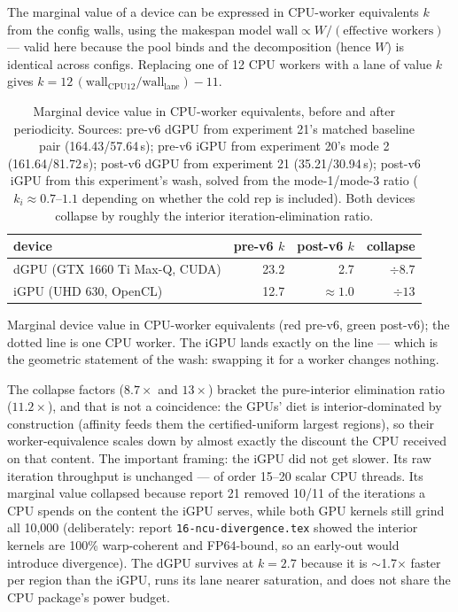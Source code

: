 \documentclass[
	english,
	letterpaper, oneside
]{article}
\begin{document}
The marginal value of a device can be expressed in CPU-worker equivalents
$k$ from the config walls, using the makespan model
$\text{wall} \propto W/(\text{effective workers})$ --- valid here because the
pool binds and the decomposition (hence $W$) is identical across configs.
Replacing one of 12 CPU workers with a lane of value $k$ gives
$k = 12\,({\text{wall}_{\text{CPU12}}}/{\text{wall}_{\text{lane}}}) - 11$.

\begin{table}[H]
\centering
\caption{Marginal device value in CPU-worker equivalents, before and after
periodicity. Sources: pre-v6 dGPU from experiment 21's matched baseline pair
(164.43/57.64\,s); pre-v6 iGPU from experiment 20's mode 2 (161.64/81.72\,s);
post-v6 dGPU from experiment 21 (35.21/30.94\,s); post-v6 iGPU from this
experiment's wash, solved from the mode-1/mode-3 ratio ($k_i \approx
0.7$--$1.1$ depending on whether the cold rep is included). Both devices
collapse by roughly the interior iteration-elimination ratio.\label{tab:k}}
\begin{tabular}{lrrr}
\toprule
device & pre-v6 $k$ & post-v6 $k$ & collapse \\
\midrule
dGPU (GTX 1660 Ti Max-Q, CUDA) & 23.2 & 2.7 & $\div 8.7$ \\
iGPU (UHD 630, OpenCL) & 12.7 & $\approx 1.0$ & $\div 13$ \\
\bottomrule
\end{tabular}
\end{table}

            {Marginal device value in CPU-worker equivalents (red pre-v6,
             green post-v6); the dotted line is one CPU worker. The iGPU
             lands exactly on the line --- which is the geometric statement
             of the wash: swapping it for a worker changes nothing.
             \label{fig:reprice}}

The collapse factors ($8.7\times$ and $13\times$) bracket the pure-interior
elimination ratio ($11.2\times$), and that is not a coincidence: the GPUs'
diet is interior-dominated by construction (affinity feeds them the
certified-uniform largest regions), so their worker-equivalence scales down
by almost exactly the discount the CPU received on that content. The
important framing: the iGPU did not get slower. Its raw iteration
throughput is unchanged --- of order 15--20 scalar CPU threads. Its
marginal value collapsed because report 21 removed 10/11 of the
iterations a CPU spends on the content the iGPU serves, while both GPU
kernels still grind all 10{,}000 (deliberately: report
\texttt{16-ncu-divergence.tex} showed the interior kernels are 100\%
warp-coherent and FP64-bound, so an early-out would introduce divergence).
The dGPU survives at $k=2.7$ because it is $\sim$1.7$\times$ faster per
region than the iGPU, runs its lane nearer saturation, and does not share
the CPU package's power budget.
\end{document}

